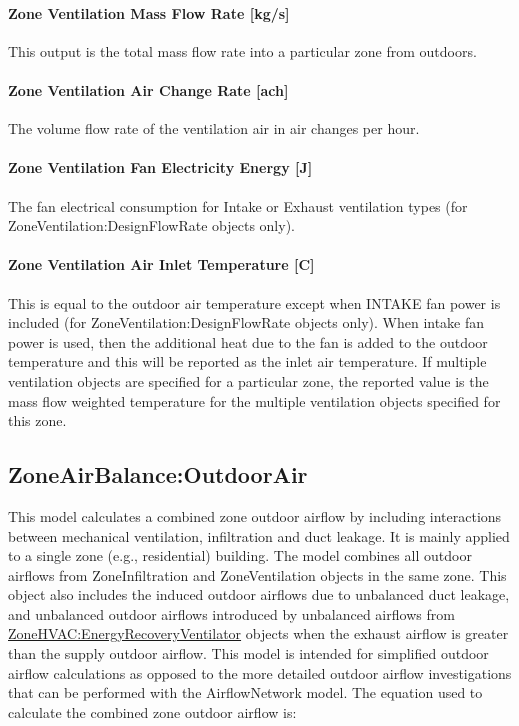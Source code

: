 \paragraph{Zone Ventilation Mass Flow Rate {[}kg/s{]}}\label{zone-ventilation-mass-flow-rate-kgs}

This output is the total mass flow rate into a particular zone from outdoors.

\paragraph{Zone Ventilation Air Change Rate {[}ach{]}}\label{zone-ventilation-air-change-rate-ach}

The volume flow rate of the ventilation air in air changes per hour.

\paragraph{Zone Ventilation Fan Electricity Energy {[}J{]}}\label{zone-ventilation-fan-electric-energy-j}

The fan electrical consumption for Intake or Exhaust ventilation types (for ZoneVentilation:DesignFlowRate objects only).

\paragraph{Zone Ventilation Air Inlet Temperature {[}C{]}}\label{zone-ventilation-air-inlet-temperature-c}

This is equal to the outdoor air temperature except when INTAKE fan power is included (for ZoneVentilation:DesignFlowRate objects only). When intake fan power is used, then the additional heat due to the fan is added to the outdoor temperature and this will be reported as the inlet air temperature. If multiple ventilation objects are specified for a particular zone, the reported value is the mass flow weighted temperature for the multiple ventilation objects specified for this zone.

\subsection{ZoneAirBalance:OutdoorAir}\label{zoneairbalanceoutdoorair}

This model calculates a combined zone outdoor airflow by including interactions between mechanical ventilation, infiltration and duct leakage. It is mainly applied to a single zone (e.g., residential) building. The model combines all outdoor airflows from ZoneInfiltration and ZoneVentilation objects in the same zone. This object also includes the induced outdoor airflows due to unbalanced duct leakage, and unbalanced outdoor airflows introduced by unbalanced airflows from \hyperref[zonehvacenergyrecoveryventilator]{ZoneHVAC:EnergyRecoveryVentilator} objects when the exhaust airflow is greater than the supply outdoor airflow. This model is intended for simplified outdoor airflow calculations as opposed to the more detailed outdoor airflow investigations that can be performed with the AirflowNetwork model. The equation used to calculate the combined zone outdoor airflow is:

